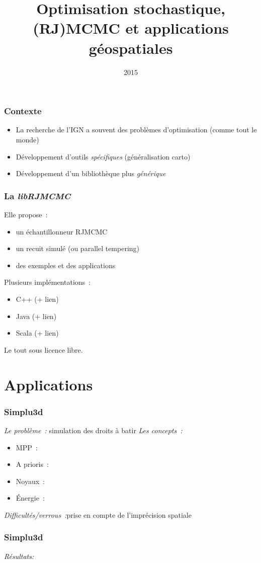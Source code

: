 \documentclass{beamer}
\title{Optimisation stochastique, (RJ)MCMC et applications g\'eospatiales}
\author{}
\institute{IGN}
\date{2015}
\begin{document}
\frame{\titlepage}
 
\begin{frame}
\frametitle{Contexte}
\begin{itemize}
\item La recherche de l'IGN a souvent des probl\`emes d'optimisation (comme tout le monde)
\item D\'eveloppement d'outils \emph{sp\'ecifiques} (g\'en\'eralisation carto)
\item D\'eveloppement d'un biblioth\`eque plus \emph{g\'en\'erique}
\end{itemize}
\end{frame}

\begin{frame}
\frametitle{La \emph{libRJMCMC}}
Elle propose~:
\begin{itemize}
\item un \'echantillonneur RJMCMC
\item un recuit simul\'e (ou parallel tempering)
\item des exemples et des applications
\end{itemize}
Plusieurs impl\'ementations~:
\begin{itemize}
\item C++ (+ lien)
\item Java (+ lien)
\item Scala (+ lien)
\end{itemize}
Le tout sous licence libre.
\end{frame}

\section{Applications}
\begin{frame}
\frametitle{Simplu3d}
\emph{Le probl\`eme~:} simulation des droits \`a batir
\emph{Les concepts~:}
\begin{itemize}
\item MPP~:
\item A prioris~:
\item Noyaux~:
\item \'Energie~:
\end{itemize}
\emph{Difficultés/verrous~:}prise en compte de l'impr\'ecision spatiale
\end{frame}

\begin{frame}
\frametitle{Simplu3d}
\emph{R\'esultats:}
\end{frame}
\end{document}
